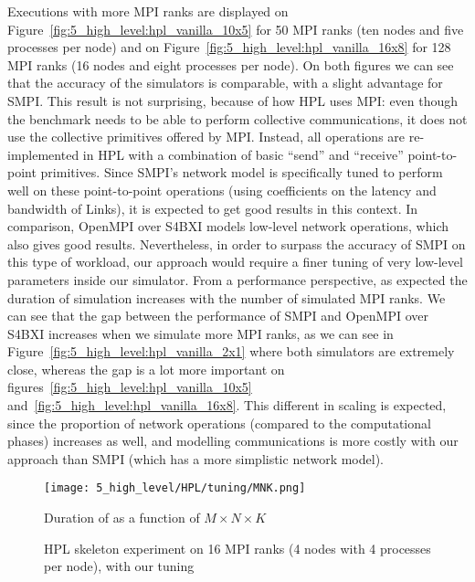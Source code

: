 Executions with more MPI ranks are displayed on
Figure~\ref{fig:5_high_level:hpl_vanilla_10x5} for 50 MPI ranks (ten nodes and
five processes per node) and on Figure~\ref{fig:5_high_level:hpl_vanilla_16x8}
for 128 MPI ranks (16 nodes and eight processes per node). On both figures we
can see that the accuracy of the simulators is comparable, with a slight
advantage for SMPI. This result is not surprising, because of how HPL uses MPI:
even though the benchmark needs to be able to perform collective communications,
it does not use the collective primitives offered by MPI. Instead, all
operations are re-implemented in HPL with a combination of basic ``send'' and
``receive'' point-to-point primitives. Since SMPI's network model is
specifically tuned to perform well on these point-to-point operations (using
coefficients on the latency and bandwidth of Links), it is expected to get good
results in this context. In comparison, OpenMPI over S4BXI models low-level
network operations, which also gives good results. Nevertheless, in order to
surpass the accuracy of SMPI on this type of workload, our approach would
require a finer tuning of very low-level parameters inside our simulator. From a
performance perspective, as expected the duration of simulation increases with
the number of simulated MPI ranks. We can see that the gap between the
performance of SMPI and OpenMPI over S4BXI increases when we simulate more MPI
ranks, as we can see in Figure~\ref{fig:5_high_level:hpl_vanilla_2x1} where both
simulators are extremely close, whereas the gap is a lot more important on
figures~\ref{fig:5_high_level:hpl_vanilla_10x5}
and~\ref{fig:5_high_level:hpl_vanilla_16x8}. This different in scaling is
expected, since the proportion of network operations (compared to the
computational phases) increases as well, and modelling communications is more
costly with our approach than SMPI (which has a more simplistic network model).

\begin{figure}[!th]
    \centering
    \texttt{[image: 5\_high\_level/HPL/tuning/MNK.png]}
    \caption{Duration of  as a function of $M \times N \times K$}
    \label{fig:5_high_level:hpl_optimized_MNK}
\end{figure}

\begin{figure}[!th]
    \centering
    \caption{HPL skeleton experiment on 16 MPI ranks (4 nodes with 4 processes per node), with our tuning}
    \label{fig:5_high_level:hpl_optimized_4x4}
\end{figure}

